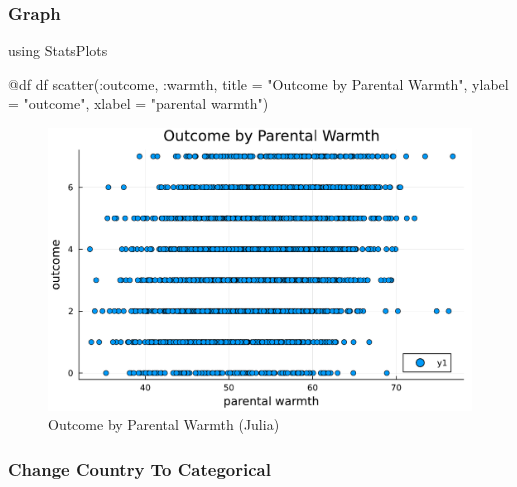 \documentclass[
  letterpaper,
  DIV=11,
  numbers=noendperiod]{scrreprt}
\newenvironment{Shaded}{\begin{snugshade}}{\end{snugshade}}
\newcommand{\BuiltInTok}[1]{\textcolor[rgb]{0.00,0.23,0.31}{#1}}
\newcommand{\FunctionTok}[1]{\textcolor[rgb]{0.28,0.35,0.67}{#1}}
\newcommand{\ImportTok}[1]{\textcolor[rgb]{0.00,0.46,0.62}{#1}}
\newcommand{\NormalTok}[1]{\textcolor[rgb]{0.00,0.23,0.31}{#1}}
\newcommand{\OperatorTok}[1]{\textcolor[rgb]{0.37,0.37,0.37}{#1}}
\newcommand{\PreprocessorTok}[1]{\textcolor[rgb]{0.68,0.00,0.00}{#1}}
\newcommand{\StringTok}[1]{\textcolor[rgb]{0.13,0.47,0.30}{#1}}
\begin{document}
\hypertarget{graph-2}{%
\subsubsection{Graph}\label{graph-2}}

\begin{Shaded}
\begin{Highlighting}[]
\ImportTok{using} \BuiltInTok{StatsPlots}

\PreprocessorTok{@df}\NormalTok{ df }\FunctionTok{scatter}\NormalTok{(}\OperatorTok{:}\NormalTok{outcome, }\OperatorTok{:}\NormalTok{warmth, }
\NormalTok{               title }\OperatorTok{=} \StringTok{"Outcome by Parental Warmth"}\NormalTok{,}
\NormalTok{               ylabel }\OperatorTok{=} \StringTok{"outcome"}\NormalTok{,}
\NormalTok{               xlabel }\OperatorTok{=} \StringTok{"parental warmth"}\NormalTok{)}
\end{Highlighting}
\end{Shaded}

\begin{figure}[H]

{\centering \includegraphics{index_files/figure-pdf/fig-Julia-J1.pdf}

}

\caption{\label{fig-Julia}Outcome by Parental Warmth (Julia)}

\end{figure}

\hypertarget{change-country-to-categorical}{%
\subsubsection{Change Country To
Categorical}\label{change-country-to-categorical}}
\end{document}
